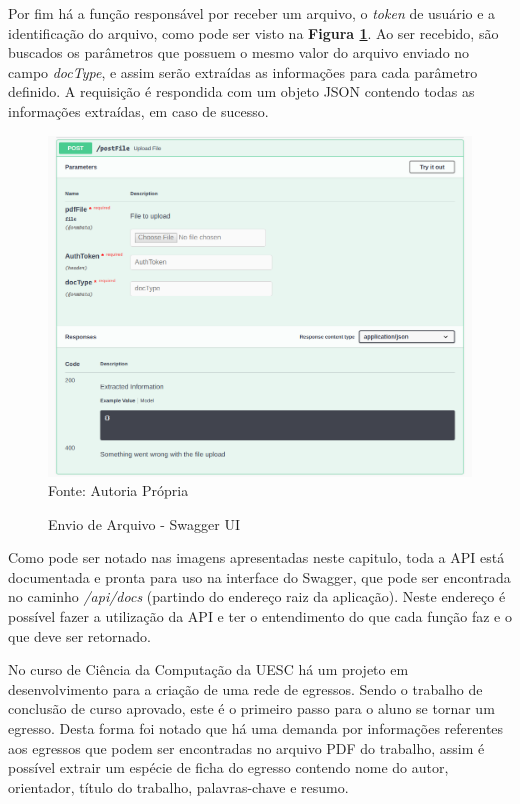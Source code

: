 Por fim há a função responsável por receber um arquivo, o \textit{token} de usuário e a identificação do arquivo, como pode ser visto na \textbf{Figura \ref{swaggerUploadFile}}. Ao ser recebido, são buscados os parâmetros que possuem o mesmo valor do arquivo enviado no campo \textit{docType}, e assim serão extraídas as informações para cada parâmetro definido. A requisição é respondida com um objeto JSON contendo todas as informações extraídas, em caso de sucesso.

\begin{figure}[H]
\centering
\captionsetup{justification   = raggedright,
              singlelinecheck = false}
\caption{Envio de Arquivo - Swagger UI}\label{swaggerUploadFile}
\includegraphics[width=1\textwidth]{figs/swaggerUploadFile.png}
\footnotesize Fonte: Autoria Própria
\end{figure}

Como pode ser notado nas imagens apresentadas neste capitulo, toda a API está documentada e pronta para uso na interface do Swagger, que pode ser encontrada no caminho \textit{/api/docs} (partindo do endereço raiz da aplicação). Neste endereço é possível fazer a utilização da API e ter o entendimento do que cada função faz e o que deve ser retornado.

No curso de Ciência da Computação da UESC há um projeto em desenvolvimento para a criação de uma rede de egressos. Sendo o trabalho de conclusão de curso aprovado, este é o primeiro passo para o aluno se tornar um egresso. Desta forma foi notado que há uma demanda por informações referentes aos egressos que podem ser encontradas no arquivo PDF do trabalho, assim é possível extrair um espécie de ficha do egresso contendo nome do autor, orientador, título do trabalho, palavras-chave e resumo.

